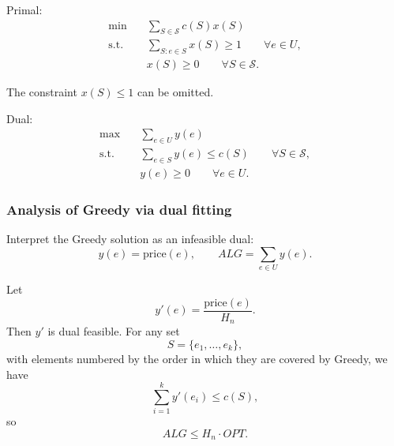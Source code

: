\documentclass[12pt,a4paper]{report}
\begin{document}
Primal:
\[
\begin{aligned}
\min \quad & \sum_{S\in \mathcal{S}} c(S)x(S) \\
\text{s.t.} \quad & \sum_{S:e\in S} x(S)\ge 1 \qquad \forall e\in U, \\
& x(S)\ge 0 \qquad \forall S\in \mathcal{S}.
\end{aligned}
\]

The constraint $x(S)\le 1$ can be omitted.

Dual:
\[
\begin{aligned}
\max \quad & \sum_{e\in U} y(e) \\
\text{s.t.} \quad & \sum_{e\in S} y(e)\le c(S) \qquad \forall S\in \mathcal{S}, \\
& y(e)\ge 0 \qquad \forall e\in U.
\end{aligned}
\]

\subsubsection{Analysis of Greedy via dual fitting}

Interpret the Greedy solution as an infeasible dual:
\[
y(e)=\text{price}(e), \qquad ALG=\sum_{e\in U} y(e).
\]

Let
\[
y'(e)=\frac{\text{price}(e)}{H_n}.
\]
Then $y'$ is dual feasible. For any set
\[
S=\{e_1,\dots,e_k\},
\]
with elements numbered by the order in which they are covered by Greedy, we have
\[
\sum_{i=1}^k y'(e_i)\le c(S),
\]
so
\[
ALG \le H_n \cdot OPT.
\]
\end{document}

